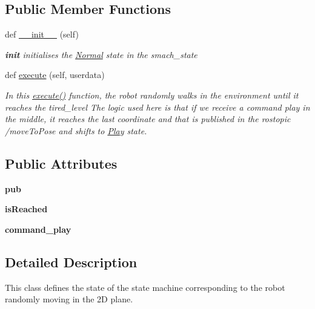 \subsection*{Public Member Functions}
\begin{DoxyCompactItemize}
\item 
def \hyperlink{classstate__behavior_1_1Normal_a73b4aa2844d6c7f4b35bbb53cea791dd}{\+\_\+\+\_\+init\+\_\+\+\_\+} (self)
\begin{DoxyCompactList}\small\item\em {\bfseries init} initialises the \hyperlink{classstate__behavior_1_1Normal}{Normal} state in the smach\+\_\+state \end{DoxyCompactList}\item 
def \hyperlink{classstate__behavior_1_1Normal_ad34ac585f5ba450b5e2921bb69132f4d}{execute} (self, userdata)
\begin{DoxyCompactList}\small\item\em In this \hyperlink{classstate__behavior_1_1Normal_ad34ac585f5ba450b5e2921bb69132f4d}{execute()} function, the robot randomly walks in the environment until it reaches the tired\+\_\+level The logic used here is that if we receive a command play in the middle, it reaches the last coordinate and that is published in the rostopic /move\+To\+Pose and shifts to \hyperlink{classstate__behavior_1_1Play}{Play} state. \end{DoxyCompactList}\end{DoxyCompactItemize}
\subsection*{Public Attributes}
\begin{DoxyCompactItemize}
\item 
\mbox{\label{classstate__behavior_1_1Normal_af8396ab1f88ae1ea117eab1702245e35}} 
{\bfseries pub}
\item 
\mbox{\label{classstate__behavior_1_1Normal_af3a907e6ca2e16d50543abb06dc8e41c}} 
{\bfseries is\+Reached}
\item 
\mbox{\label{classstate__behavior_1_1Normal_a9569665701706ec91ab67cb28f4ad231}} 
{\bfseries command\+\_\+play}
\end{DoxyCompactItemize}


\subsection{Detailed Description}
This class defines the state of the state machine corresponding to the robot randomly moving in the 2D plane. 

